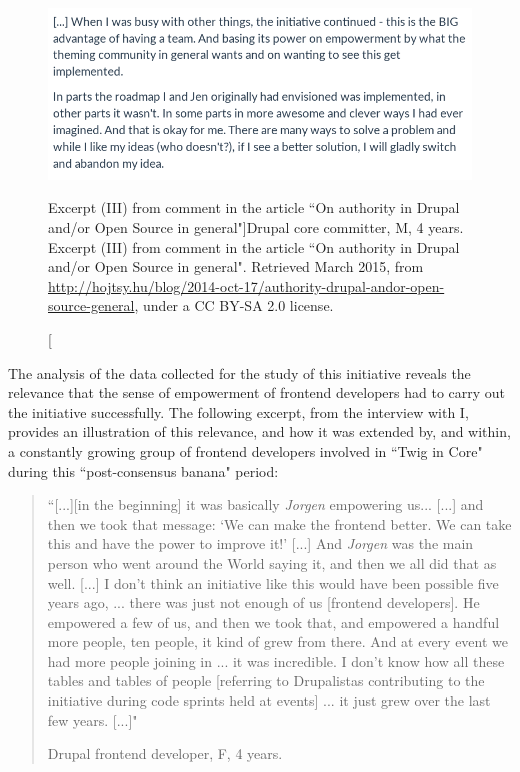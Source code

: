 \begin{figure}[H]
\centering
\includegraphics[scale=0.5]{img/quotes_replacement/quote_twig_cc3.png}
 \caption[Excerpt (III) from comment in the article ``On authority in Drupal and/or Open Source in general"]{Drupal core committer, M, 4 years. Excerpt (III) from comment in the article ``On authority in Drupal and/or Open Source in general". Retrieved  March 2015, from \url{http://hojtsy.hu/blog/2014-oct-17/authority-drupal-andor-open-source-general}, under a CC BY-SA 2.0 license.}
\label{quote_twig_core_03}
\end{figure}

The analysis of the data collected for the study of this initiative reveals the relevance that the sense of empowerment of frontend developers had to carry out the initiative successfully. The following excerpt, from the interview with I, provides an illustration of this relevance, and how it was extended by, and within, a constantly growing group of frontend developers involved in ``Twig in Core" during this ``post-consensus banana" period:

\begin{quotation}
``[...][in the beginning] it was basically \textit{Jorgen} empowering us... [...] and then we took that message: `We can make the frontend better. We can take this and have the power to improve it!' [...] And \textit{Jorgen} was the main person who went around the World saying it, and then we all did that as well. [...] I don't think an initiative like this would have been possible five years ago, ... there was just not enough of us [frontend developers]. He empowered a few of us, and then we took that, and empowered a handful more people, ten people, it kind of grew from there. And at every event we had more people joining in ... it was incredible. I don't know how all these tables and tables of people [referring to Drupalistas contributing to the initiative during code sprints held at events] ... it just grew over the last few years. [...]"

\begin{flushright}\footnotesize{Drupal frontend developer, F, 4 years.}\end{flushright}
\end{quotation}


